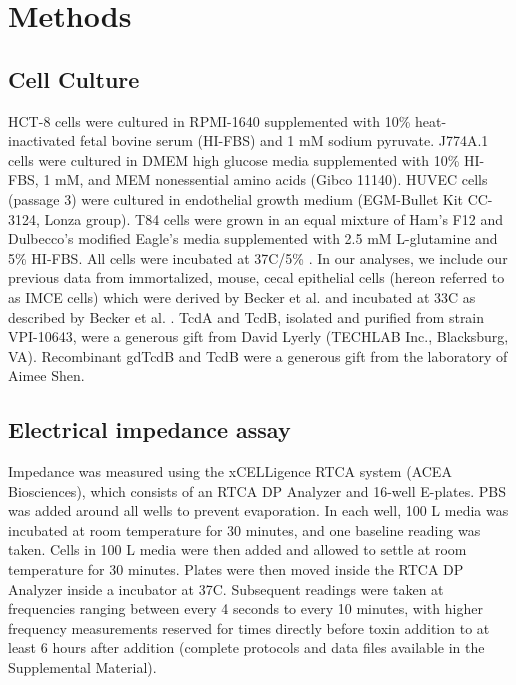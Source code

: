 \section{Methods}

\subsection{Cell Culture}
HCT-8 cells were cultured in RPMI-1640 supplemented with 10\% 
heat-inactivated fetal bovine serum (HI-FBS) and 1 mM 
sodium pyruvate. J774A.1 cells were cultured in DMEM high 
glucose media supplemented with 10\% HI-FBS, 1 mM, and 
MEM nonessential amino acids (Gibco 11140). HUVEC cells 
(passage 3) were cultured in endothelial growth medium 
(EGM-Bullet Kit CC-3124, Lonza group). T84 cells were 
grown in an equal mixture of Ham's F12 and Dulbecco's 
modified Eagle's media supplemented with 2.5 mM L-glutamine 
and 5\% HI-FBS. All cells were incubated at 
37\textdegree{}C/5\% . In our analyses, we include 
our previous data from immortalized, mouse, cecal 
epithelial cells (hereon referred to as IMCE cells) 
which were derived by Becker et al. and incubated at 
33\textdegree{}C as described by Becker et al. \cite{DAuria:2013jo,Becker:2010io}. 
TcdA and TcdB, isolated and purified from strain VPI-10643, 
were a generous gift from David Lyerly (TECHLAB Inc., Blacksburg, VA). 
Recombinant gdTcdB and TcdB were a generous gift from the 
laboratory of Aimee Shen.

\subsection{Electrical impedance assay}
Impedance was measured using the xCELLigence RTCA 
system (ACEA Biosciences), which consists of an RTCA 
DP Analyzer and 16-well E-plates. PBS was added around 
all wells to prevent evaporation. In each well, 100 \textmugreek{}L 
media was incubated at room temperature for 30 minutes, 
and one baseline reading was taken. Cells in 100 \textmugreek{}L 
media were then added and allowed to settle at room 
temperature for 30 minutes. Plates were then moved inside 
the RTCA DP Analyzer inside a  incubator at 37\textdegree{}C. 
Subsequent readings were taken at frequencies ranging between 
every 4 seconds to every 10 minutes, with higher frequency 
measurements reserved for times directly before toxin 
addition to at least 6 hours after addition (complete 
protocols and data files available in the Supplemental Material).

